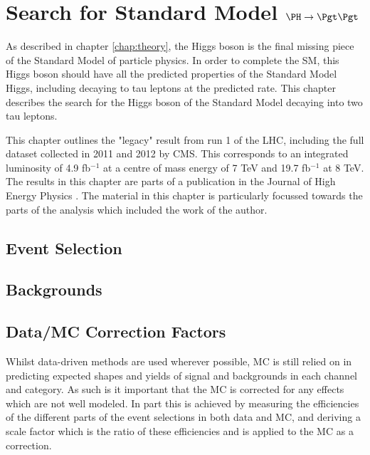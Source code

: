 \chapter{Search for Standard Model $\PH \to \Pgt\Pgt$}
\label{chap:httSM}

As described in chapter \ref{chap:theory}, the Higgs boson is the final missing 
piece of the Standard Model of particle physics. In order to complete the SM, 
this Higgs boson should have all the predicted properties of the Standard Model
Higgs, including decaying to tau leptons at the predicted rate. This
chapter describes the search for the Higgs boson of the Standard Model 
decaying into two tau leptons.

This chapter outlines the "legacy" result from run 1 of the LHC, including the
full dataset collected in 2011 and 2012 by CMS. This corresponds to an
integrated luminosity of 4.9 fb$^{-1}$ at a centre of mass energy of 7 TeV and
19.7 fb$^{-1}$ at 8 TeV. The results in this chapter are parts of a publication 
in the Journal of High Energy Physics \cite{}. The material in this chapter is
particularly focussed towards the parts of the analysis which included the work
of the author.

\section{Event Selection}

\section{Backgrounds}

\section{Data/MC Correction Factors}

Whilst data-driven methods are used wherever possible, MC is still
relied on in predicting expected shapes and yields of signal and backgrounds in
each channel and category. As such is it important that the MC is corrected for
any effects which are not well modeled. In part this is achieved by measuring
the efficiencies of the different parts of the event selections in both data and
MC, and deriving a scale factor which is the ratio of these efficiencies and is
applied to the MC as a correction.

